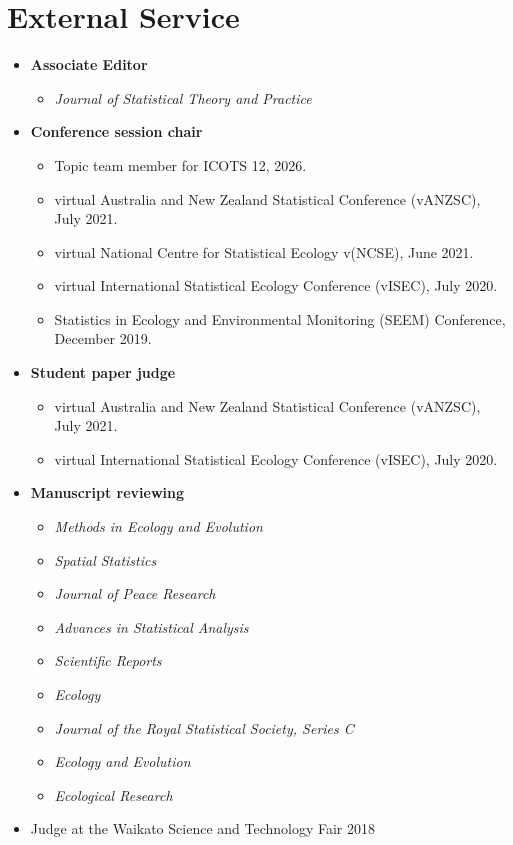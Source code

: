 \documentclass[10pt,a4paper]{moderncv}
\begin{document}
\section{External Service}
\vspace{6pt}

\begin{itemize}
\item \textbf{Associate Editor}
  \begin{itemize}
  \item \textit{Journal of Statistical Theory and Practice}
  \end{itemize}
\item \textbf{Conference session chair}
  \begin{itemize}
  \item Topic team member for ICOTS 12, 2026.
  \item virtual Australia and New Zealand Statistical Conference (vANZSC), July 2021.
  \item virtual National Centre for Statistical Ecology v(NCSE), June 2021.
  \item virtual International Statistical Ecology Conference (vISEC), July 2020.
  \item Statistics in Ecology and Environmental Monitoring (SEEM) Conference, December 2019.
  \end{itemize}
\item \textbf{Student paper judge}
  \begin{itemize}
  \item virtual Australia and New Zealand Statistical Conference (vANZSC), July 2021.
  \item virtual International Statistical Ecology Conference (vISEC), July 2020.
  \end{itemize}
\item \textbf{Manuscript reviewing}
  \begin{itemize}
  \item \textit{Methods in Ecology and Evolution}
  \item \textit{Spatial Statistics}
  \item \textit{Journal of Peace Research}
  \item \textit{Advances in Statistical Analysis}
  \item   \textit{Scientific Reports}
  \item \textit{Ecology}
  \item  \textit{Journal of the Royal Statistical Society, Series C}
  \item   \textit{Ecology and Evolution}
  \item   \textit{Ecological Research}
  \end{itemize}
  \item Judge at the Waikato Science and Technology Fair 2018
\end{itemize}
\end{document}
